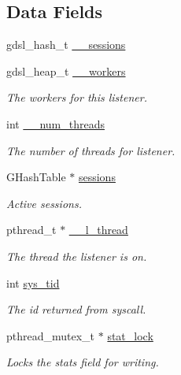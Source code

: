\subsection*{Data Fields}
\begin{DoxyCompactItemize}
\item 
gdsl\-\_\-hash\-\_\-t \hyperlink{structtb__listener__t_a297b6218401cf4b88bf011d2665be0d2}{\-\_\-\-\_\-sessions}
\item 
gdsl\-\_\-heap\-\_\-t \hyperlink{structtb__listener__t_a41b2b73dc00fee2a18f90afa4987cc5b}{\-\_\-\-\_\-workers}
\begin{DoxyCompactList}\small\item\em The workers for this listener. \end{DoxyCompactList}\item 
int \hyperlink{structtb__listener__t_a49ffb28f94389b1ca495a663507db665}{\-\_\-\-\_\-num\-\_\-threads}
\begin{DoxyCompactList}\small\item\em The number of threads for listener. \end{DoxyCompactList}\item 
G\-Hash\-Table $\ast$ \hyperlink{structtb__listener__t_a696d2a3fd36c8895302b9372d1e55935}{sessions}
\begin{DoxyCompactList}\small\item\em Active sessions. \end{DoxyCompactList}\item 
pthread\-\_\-t $\ast$ \hyperlink{structtb__listener__t_a104cf2a79e8cb03fe3c0d3301fe8257f}{\-\_\-\-\_\-l\-\_\-thread}
\begin{DoxyCompactList}\small\item\em The thread the listener is on. \end{DoxyCompactList}\item 
int \hyperlink{structtb__listener__t_a053be2f9198a10c7329b11c19dfc6fe4}{sys\-\_\-tid}
\begin{DoxyCompactList}\small\item\em The id returned from syscall. \end{DoxyCompactList}\item 
pthread\-\_\-mutex\-\_\-t $\ast$ \hyperlink{structtb__listener__t_ab828bf6b1b85621025b518a892b79d79}{stat\-\_\-lock}
\begin{DoxyCompactList}\small\item\em Locks the stats field for writing. \end{DoxyCompactList}\item 

\end{DoxyCompactItemize}

